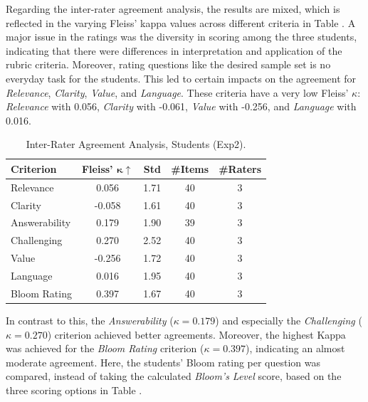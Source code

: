 Regarding the inter-rater agreement analysis, the results are mixed, which is reflected in the varying Fleiss' kappa values across different criteria in Table . A major issue in the ratings was the diversity in scoring among the three students, indicating that there were differences in interpretation and application of the rubric criteria. Moreover, rating questions like the desired sample set is no everyday task for the students. This led to certain impacts on the agreement for \textit{Relevance}, \textit{Clarity}, \textit{Value}, and \textit{Language}. These criteria have a very low Fleiss' $\kappa$: \textit{Relevance} with 0.056, \textit{Clarity} with -0.061, \textit{Value} with -0.256, and \textit{Language} with 0.016.

\begin{table}[H]
    \centering
    \caption{Inter-Rater Agreement Analysis, Students (Exp2).}
    \label{tab:iaa-students-exp2}
    \begin{tabular}{lcccc}
        \toprule
        \textbf{Criterion} & \textbf{Fleiss' $\mathbf{\kappa}\uparrow$} & \textbf{Std} & \textbf{\#Items} & \textbf{\#Raters} \\
        \midrule
        Relevance          & 0.056 & 1.71 & 40 & 3 \\
        Clarity            & -0.058 & 1.61 & 40 & 3 \\
        Answerability      & 0.179 & 1.90 & 39 & 3 \\
        Challenging        & 0.270 & 2.52 & 40 & 3 \\
        Value              & -0.256 & 1.72 & 40 & 3 \\
        Language           & 0.016 & 1.95 & 40 & 3 \\
        Bloom Rating       & 0.397 & 1.67 & 40 & 3 \\
        \bottomrule
    \end{tabular}
\end{table}

In contrast to this, the \textit{Answerability} ($\kappa=0.179$) and especially the \textit{Challenging} ($\kappa=0.270$) criterion achieved better agreements. Moreover, the highest Kappa was achieved for the \textit{Bloom Rating} criterion ($\kappa=0.397$), indicating an almost moderate agreement. Here, the students' Bloom rating per question was compared, instead of taking the calculated \textit{Bloom's Level} score, based on the three scoring options in Table .

